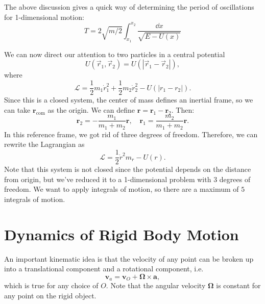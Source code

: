 \documentclass{article}
\numberwithin{equation}{section}
\begin{document}
The above discussion gives a quick way of determining the period of oscillations for 1-dimensional motion:
\begin{equation*}
    T = 2\sqrt{m/2}\int_{x_1}^{x_2}\frac{\dd{x}}{\sqrt{E-U(x)}}
\end{equation*}
\begin{example}
    We can now direct our attention to two particles in a central potential
    \begin{equation*}
        U(\vec{r}_1,\vec{r}_2) = U(|\vec{r}_1-\vec{r}_2|),
    \end{equation*}
    where 
    \begin{equation*}
        \mathcal{L} = \frac{1}{2}m_1\dot{r}_1^2 + \frac{1}{2}m_2\dot{r}_2^2 - U(|r_1-r_2|).
    \end{equation*}
    Since this is a closed system, the center of mass defines an inertial frame, so we can take $\bm{r}_\text{com}$ as the origin. We can define $\bm{r}=\bm{r}_1-\bm{r}_2.$ Then:
    \begin{equation*}
        \bm{r}_2 = -\frac{m_1}{m_1+m_2}\bm{r},\quad \bm{r}_1 = \frac{m_2}{m_1+m_2}\bm{r}.
    \end{equation*}
    In this reference frame, we got rid of three degrees of freedom. Therefore, we can rewrite the Lagrangian as
    \begin{equation*}
        \mathcal{L} = \frac{1}{2}\dot{r}^2m_r - U(r).
    \end{equation*}
    Note that this system is not closed since the potential depends on the distance from origin, but we've reduced it to a 1-dimensional problem with 3 degrees of freedom. We want to apply integrals of motion, so there are a maximum of $5$ integrals of motion.
\end{example}
\section{Dynamics of Rigid Body Motion}
An important kinematic idea is that the velocity of any point can be broken up into a translational component and a rotational component, i.e. 
\begin{equation}
    \bm{v}_a = \bm{v}_O + \bm{\Omega} \times \bm{a},
\end{equation}
which is true for any choice of $O$. Note that the angular velocity $\bm{\Omega}$ is constant for any point on the rigid object.
\end{document}
